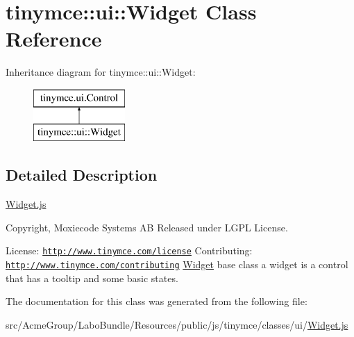\hypertarget{classtinymce_1_1ui_1_1_widget}{\section{tinymce\+:\+:ui\+:\+:Widget Class Reference}
\label{classtinymce_1_1ui_1_1_widget}
}
Inheritance diagram for tinymce\+:\+:ui\+:\+:Widget\+:\begin{figure}[H]
\begin{center}
\leavevmode
\includegraphics[height=2.000000cm]{classtinymce_1_1ui_1_1_widget}
\end{center}
\end{figure}


\subsection{Detailed Description}
\hyperlink{_widget_8js}{Widget.\+js}

Copyright, Moxiecode Systems A\+B Released under L\+G\+P\+L License.

License\+: \href{http://www.tinymce.com/license}{\tt http\+://www.\+tinymce.\+com/license} Contributing\+: \href{http://www.tinymce.com/contributing}{\tt http\+://www.\+tinymce.\+com/contributing} \hyperlink{classtinymce_1_1ui_1_1_widget}{Widget} base class a widget is a control that has a tooltip and some basic states. 

The documentation for this class was generated from the following file\+:\begin{DoxyCompactItemize}
\item 
src/\+Acme\+Group/\+Labo\+Bundle/\+Resources/public/js/tinymce/classes/ui/\hyperlink{_widget_8js}{Widget.\+js}\end{DoxyCompactItemize}
